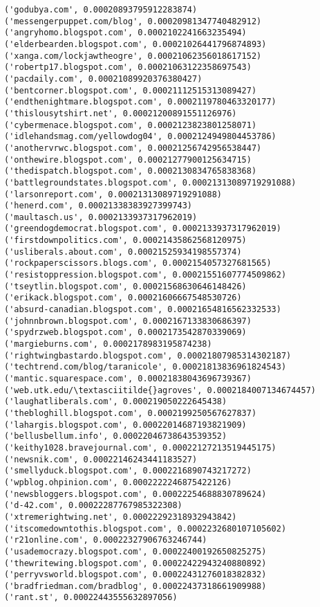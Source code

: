 \documentclass[11pt]{article}
\begin{document}
\begin{Verbatim}[commandchars=\\\{\}]
('godubya.com', 0.00020893795912283874)
('messengerpuppet.com/blog', 0.00020981347740482912)
('angryhomo.blogspot.com', 0.0002102241663235494)
('elderbearden.blogspot.com', 0.00021026441796874893)
('xanga.com/lockjawtheogre', 0.00021062356018617152)
('robertp17.blogspot.com', 0.00021063122358697543)
('pacdaily.com', 0.00021089920376380427)
('bentcorner.blogspot.com', 0.00021112515313089427)
('endthenightmare.blogspot.com', 0.0002119780463320177)
('thislousytshirt.net', 0.00021200891551126976)
('cybermenace.blogspot.com', 0.0002123823801258071)
('idlehandsmag.com/yellowdog04', 0.0002124949804453786)
('anothervrwc.blogspot.com', 0.00021256742956538447)
('onthewire.blogspot.com', 0.00021277900125634715)
('thedispatch.blogspot.com', 0.0002130834765838368)
('battlegroundstates.blogspot.com', 0.00021313089719291088)
('larsonreport.com', 0.00021313089719291088)
('henerd.com', 0.00021338383927399743)
('maultasch.us', 0.0002133937317962019)
('greendogdemocrat.blogspot.com', 0.0002133937317962019)
('firstdownpolitics.com', 0.00021435862568120975)
('usliberals.about.com', 0.00021525934198557374)
('rockpaperscissors.blogs.com', 0.0002154057327681565)
('resistoppression.blogspot.com', 0.00021551607774509862)
('tseytlin.blogspot.com', 0.00021568630646148426)
('erikack.blogspot.com', 0.00021606667548530726)
('absurd-canadian.blogspot.com', 0.00021654816562332533)
('johnnbrown.blogspot.com', 0.0002167133830686397)
('spydrzweb.blogspot.com', 0.0002173542870339069)
('margieburns.com', 0.0002178983195874238)
('rightwingbastardo.blogspot.com', 0.00021807985314302187)
('techtrend.com/blog/taranicole', 0.00021813836961824543)
('mantic.squarespace.com', 0.00021838043696739367)
('web.utk.edu/\textasciitilde{}agroves', 0.0002184007134674457)
('laughatliberals.com', 0.000219050222645438)
('thebloghill.blogspot.com', 0.0002199250567627837)
('lahargis.blogspot.com', 0.00022014687193821909)
('bellusbellum.info', 0.00022046738643539352)
('keithy1028.bravejournal.com', 0.00022127213519445175)
('newsnik.com', 0.00022146243441183527)
('smellyduck.blogspot.com', 0.0002216890743217272)
('wpblog.ohpinion.com', 0.0002222246875422126)
('newsbloggers.blogspot.com', 0.00022254688830789624)
('d-42.com', 0.00022287767985322308)
('xtremerightwing.net', 0.00022292318932943842)
('itscomedowntothis.blogspot.com', 0.0002232680107105602)
('r21online.com', 0.00022327906763246744)
('usademocrazy.blogspot.com', 0.00022400192650825275)
('thewritewing.blogspot.com', 0.00022422943240880892)
('perryvsworld.blogspot.com', 0.00022431276018382832)
('bradfriedman.com/bradblog', 0.00022437318661909988)
('rant.st', 0.00022443555632897056)

\end{Verbatim}
\end{document}
